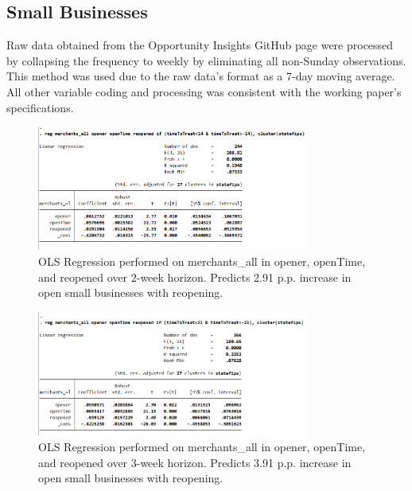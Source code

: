 \documentclass[12pt,letterpaper]{article}
\begin{document}
      \subsection{Small Businesses}
        Raw data obtained from the Opportunity Insights GitHub page were processed by collapsing the frequency to weekly by eliminating all non-Sunday observations.  This method was used due to the raw data’s format as a 7-day moving average.  All other variable coding and processing was consistent with the working paper’s specifications.
        \begin{figure}[!ht]
          \centering
          \includegraphics[width=0.8\textwidth]{figures/merchants_all_2wk.png}
\caption{OLS Regression performed on merchants\_all in opener, openTime, and reopened over 2-week horizon.  Predicts 2.91 p.p. increase in open small businesses with reopening.}
          \label{fig:figures-merchants_all_2wk-png}
        \end{figure}
        \begin{figure}[!ht]
          \centering
          \includegraphics[width=0.8\textwidth]{figures/merchants_all_3wk.png}
\caption{OLS Regression performed on merchants\_all in opener, openTime, and reopened over 3-week horizon.  Predicts 3.91 p.p. increase in open small businesses with reopening.}
          \label{fig:figures-merchants_all_3wk-png}
        \end{figure}
\end{document}
